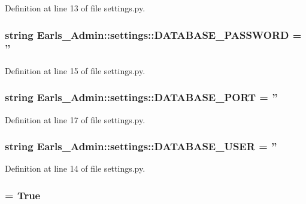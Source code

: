 Definition at line 13 of file settings.py.\hypertarget{namespaceEarls__Admin_1_1settings_4191bd3300873d52435e869ed50b520d}{
\subsubsection[DATABASE\_\-PASSWORD]{\setlength{\rightskip}{0pt plus 5cm}string {\bf Earls\_\-Admin::settings::DATABASE\_\-PASSWORD} = ''}}
\label{namespaceEarls__Admin_1_1settings_4191bd3300873d52435e869ed50b520d}




Definition at line 15 of file settings.py.\hypertarget{namespaceEarls__Admin_1_1settings_5e7ebdbd6adea1299fb1eedd884e4b54}{
\subsubsection[DATABASE\_\-PORT]{\setlength{\rightskip}{0pt plus 5cm}string {\bf Earls\_\-Admin::settings::DATABASE\_\-PORT} = ''}}
\label{namespaceEarls__Admin_1_1settings_5e7ebdbd6adea1299fb1eedd884e4b54}




Definition at line 17 of file settings.py.\hypertarget{namespaceEarls__Admin_1_1settings_beb9dcec00dbb396bbb02903cf7a13ac}{
\subsubsection[DATABASE\_\-USER]{\setlength{\rightskip}{0pt plus 5cm}string {\bf Earls\_\-Admin::settings::DATABASE\_\-USER} = ''}}
\label{namespaceEarls__Admin_1_1settings_beb9dcec00dbb396bbb02903cf7a13ac}




Definition at line 14 of file settings.py.\hypertarget{namespaceEarls__Admin_1_1settings_e58131328640fef40d096f0117bc1a1e}{
\subsubsection[DEBUG]{ = True}}
\label{namespaceEarls__Admin_1_1settings_e58131328640fef40d096f0117bc1a1e}




